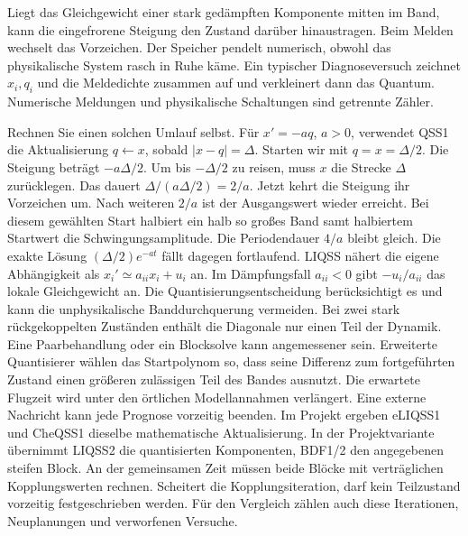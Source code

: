 \hypertarget{punkt6-3-1}{}
Liegt das Gleichgewicht einer stark gedämpften Komponente mitten im Band, kann die eingefrorene Steigung den Zustand darüber hinaustragen. Beim Melden wechselt das Vorzeichen. Der Speicher pendelt numerisch, obwohl das physikalische System rasch in Ruhe käme. Ein typischer Diagnoseversuch zeichnet \(x_i,q_i\) und die Meldedichte zusammen auf und verkleinert dann das Quantum. Numerische Meldungen und physikalische Schaltungen sind getrennte Zähler.

Rechnen Sie einen solchen Umlauf selbst. Für \(x'=-a q\), \(a>0\), verwendet QSS1 die Aktualisierung \(q\leftarrow x\), sobald \(|x-q|=\Delta\). Starten wir mit \(q=x=\Delta/2\). Die Steigung beträgt \(-a\Delta/2\). Um bis \(-\Delta/2\) zu reisen, muss \(x\) die Strecke \(\Delta\) zurücklegen. Das dauert \(\Delta/(a\Delta/2)=2/a\). Jetzt kehrt die Steigung ihr Vorzeichen um. Nach weiteren \(2/a\) ist der Ausgangswert wieder erreicht. Bei diesem gewählten Start halbiert ein halb so großes Band samt halbiertem Startwert die Schwingungsamplitude. Die Periodendauer \(4/a\) bleibt gleich. Die exakte Lösung \((\Delta/2)e^{-at}\) fällt dagegen fortlaufend.
\hypertarget{punkt6-4-1}{}
LIQSS nähert die eigene Abhängigkeit als \(x_i'\simeq a_{ii}x_i+u_i\) an. Im Dämpfungsfall \(a_{ii}<0\) gibt \(-u_i/a_{ii}\) das lokale Gleichgewicht an. Die Quantisierungsentscheidung berücksichtigt es und kann die unphysikalische Banddurchquerung vermeiden. Bei zwei stark rückgekoppelten Zuständen enthält die Diagonale nur einen Teil der Dynamik. Eine Paarbehandlung oder ein Blocksolve kann angemessener sein.
\hypertarget{punkt6-4-2}{}
Erweiterte Quantisierer wählen das Startpolynom so, dass seine Differenz zum fortgeführten Zustand einen größeren zulässigen Teil des Bandes ausnutzt. Die erwartete Flugzeit wird unter den örtlichen Modellannahmen verlängert. Eine externe Nachricht kann jede Prognose vorzeitig beenden. Im Projekt ergeben eLIQSS1 und CheQSS1 dieselbe mathematische Aktualisierung.
\hypertarget{punkt6-4-3}{}
In der Projektvariante übernimmt LIQSS2 die quantisierten Komponenten, BDF1/2 den angegebenen steifen Block. An der gemeinsamen Zeit müssen beide Blöcke mit verträglichen Kopplungswerten rechnen. Scheitert die Kopplungsiteration, darf kein Teilzustand vorzeitig festgeschrieben werden. Für den Vergleich zählen auch diese Iterationen, Neuplanungen und verworfenen Versuche.
